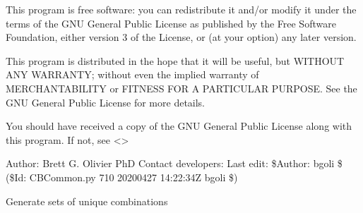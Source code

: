 \documentclass[letterpaper,10pt,english]{sphinxmanual}
\begin{document}
\sphinxAtStartPar
This program is free software: you can redistribute it and/or modify
it under the terms of the GNU General Public License as published by
the Free Software Foundation, either version 3 of the License, or
(at your option) any later version.

\sphinxAtStartPar
This program is distributed in the hope that it will be useful,
but WITHOUT ANY WARRANTY; without even the implied warranty of
MERCHANTABILITY or FITNESS FOR A PARTICULAR PURPOSE.  See the
GNU General Public License for more details.

\sphinxAtStartPar
You should have received a copy of the GNU General Public License
along with this program.  If not, see \textless{}\textgreater{}

\sphinxAtStartPar
Author: Brett G. Olivier PhD
Contact developers: 
Last edit: \$Author: bgoli \$ (\$Id: CBCommon.py 710 2020\sphinxhyphen{}04\sphinxhyphen{}27 14:22:34Z bgoli \$)

\begin{fulllineitems}
\label{\detokenize{modules_doc:cbmpy.CBCommon.ComboGen}}
\pysigstartsignatures
{}
\pysigstopsignatures
\sphinxAtStartPar
Generate sets of unique combinations

\end{fulllineitems}

\end{document}
